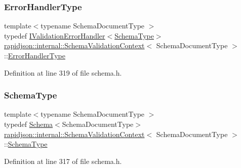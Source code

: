 \subsubsection{\texorpdfstring{ErrorHandlerType}{ErrorHandlerType}}
{\footnotesize\ttfamily template$<$typename Schema\+Document\+Type $>$ \\
typedef \mbox{\hyperlink{classrapidjson_1_1internal_1_1_i_validation_error_handler}{I\+Validation\+Error\+Handler}}$<$\mbox{\hyperlink{structrapidjson_1_1internal_1_1_schema_validation_context_ae7fc7012fdcdb1b0141b73842c814644}{Schema\+Type}}$>$ \mbox{\hyperlink{structrapidjson_1_1internal_1_1_schema_validation_context}{rapidjson\+::internal\+::\+Schema\+Validation\+Context}}$<$ Schema\+Document\+Type $>$\+::\mbox{\hyperlink{structrapidjson_1_1internal_1_1_schema_validation_context_aca18580c026f47ce432a5a53b71c8d24}{Error\+Handler\+Type}}}



Definition at line 319 of file schema.\+h.

\mbox{\label{structrapidjson_1_1internal_1_1_schema_validation_context_ae7fc7012fdcdb1b0141b73842c814644}} 
\subsubsection{\texorpdfstring{SchemaType}{SchemaType}}
{\footnotesize\ttfamily template$<$typename Schema\+Document\+Type $>$ \\
typedef \mbox{\hyperlink{classrapidjson_1_1internal_1_1_schema}{Schema}}$<$Schema\+Document\+Type$>$ \mbox{\hyperlink{structrapidjson_1_1internal_1_1_schema_validation_context}{rapidjson\+::internal\+::\+Schema\+Validation\+Context}}$<$ Schema\+Document\+Type $>$\+::\mbox{\hyperlink{structrapidjson_1_1internal_1_1_schema_validation_context_ae7fc7012fdcdb1b0141b73842c814644}{Schema\+Type}}}



Definition at line 317 of file schema.\+h.

\mbox{\label{structrapidjson_1_1internal_1_1_schema_validation_context_a1065fcde55a4928092fd576743e68e99}} 
